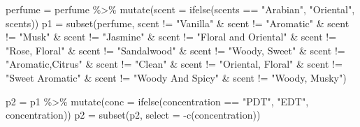 \documentclass[
]{article}
\newenvironment{Shaded}{\begin{snugshade}}{\end{snugshade}}
\newcommand{\AttributeTok}[1]{\textcolor[rgb]{0.77,0.63,0.00}{#1}}
\newcommand{\FunctionTok}[1]{\textcolor[rgb]{0.00,0.00,0.00}{#1}}
\newcommand{\NormalTok}[1]{#1}
\newcommand{\OtherTok}[1]{\textcolor[rgb]{0.56,0.35,0.01}{#1}}
\newcommand{\SpecialCharTok}[1]{\textcolor[rgb]{0.00,0.00,0.00}{#1}}
\newcommand{\StringTok}[1]{\textcolor[rgb]{0.31,0.60,0.02}{#1}}
\begin{document}
\begin{Shaded}
\begin{Highlighting}[]
\NormalTok{perfume }\OtherTok{=}\NormalTok{ perfume }\SpecialCharTok{\%\textgreater{}\%}
  \FunctionTok{mutate}\NormalTok{(}\AttributeTok{scent =} \FunctionTok{ifelse}\NormalTok{(scents }\SpecialCharTok{==} \StringTok{"Arabian"}\NormalTok{, }\StringTok{"Oriental"}\NormalTok{, scents))}
\NormalTok{p1 }\OtherTok{=} \FunctionTok{subset}\NormalTok{(perfume, scent }\SpecialCharTok{!=} \StringTok{"Vanilla"} \SpecialCharTok{\&}\NormalTok{ scent }\SpecialCharTok{!=} \StringTok{"Aromatic"} \SpecialCharTok{\&}\NormalTok{ scent }\SpecialCharTok{!=} \StringTok{"Musk"} \SpecialCharTok{\&}\NormalTok{ scent }\SpecialCharTok{!=} \StringTok{"Jasmine"} \SpecialCharTok{\&}\NormalTok{ scent }\SpecialCharTok{!=} \StringTok{"Floral and Oriental"} \SpecialCharTok{\&}\NormalTok{ scent }\SpecialCharTok{!=} \StringTok{"Rose, Floral"} \SpecialCharTok{\&}\NormalTok{ scent }\SpecialCharTok{!=} \StringTok{"Sandalwood"} \SpecialCharTok{\&}\NormalTok{ scent }\SpecialCharTok{!=} \StringTok{"Woody, Sweet"} \SpecialCharTok{\&}\NormalTok{ scent }\SpecialCharTok{!=} \StringTok{"Aromatic,Citrus"} \SpecialCharTok{\&}\NormalTok{ scent }\SpecialCharTok{!=} \StringTok{"Clean"} \SpecialCharTok{\&}\NormalTok{ scent }\SpecialCharTok{!=} \StringTok{"Oriental, Floral"} \SpecialCharTok{\&}\NormalTok{ scent }\SpecialCharTok{!=} \StringTok{"Sweet Aromatic"} \SpecialCharTok{\&}\NormalTok{ scent }\SpecialCharTok{!=} \StringTok{"Woody And Spicy"} \SpecialCharTok{\&}\NormalTok{ scent }\SpecialCharTok{!=} \StringTok{"Woody, Musky"}\NormalTok{)}
\end{Highlighting}
\end{Shaded}

\begin{Shaded}
\begin{Highlighting}[]
\NormalTok{p2 }\OtherTok{=}\NormalTok{ p1 }\SpecialCharTok{\%\textgreater{}\%} 
  \FunctionTok{mutate}\NormalTok{(}\AttributeTok{conc =} \FunctionTok{ifelse}\NormalTok{(concentration }\SpecialCharTok{==} \StringTok{"PDT"}\NormalTok{, }\StringTok{"EDT"}\NormalTok{, concentration))}
\NormalTok{p2 }\OtherTok{=} \FunctionTok{subset}\NormalTok{(p2, }\AttributeTok{select =} \SpecialCharTok{{-}}\FunctionTok{c}\NormalTok{(concentration))}
\end{Highlighting}
\end{Shaded}
\end{document}
